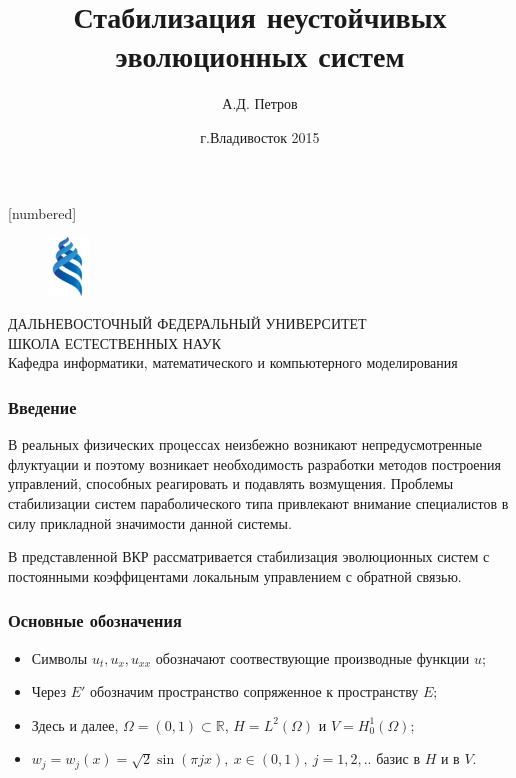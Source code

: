 \documentclass{beamer}
\title{Стабилизация неустойчивых эволюционных систем}
\author{А.Д. Петров}
\date{г.Владивосток 2015}
\begin{document}
[numbered]

\begin{frame}
    \begin{figure}[htb]
        \begin{center}
            \includegraphics[width=1.1cm]{dvfu.eps}
        \end{center}
    \end{figure}

    \begin{center}
        \large
        {ДАЛЬНЕВОСТОЧНЫЙ ФЕДЕРАЛЬНЫЙ УНИВЕРСИТЕТ } \\
        {ШКОЛА ЕСТЕСТВЕННЫХ НАУК} \\
        {Кафедра информатики, математического и компьютерного моделирования}
    \end{center}
    \titlepage

\end{frame}


\begin{frame}
    \frametitle{Введение}
    \hspace{5mm} В реальных физических процессах неизбежно возникают 
    непредусмотренные флуктуации и поэтому возникает необходимость разработки 
    методов построения управлений, способных реагировать и подавлять возмущения. 
    Проблемы стабилизации систем параболического типа привлекают внимание 
    специалистов в силу прикладной значимости данной системы.

    \hspace{5mm} В представленной ВКР рассматривается стабилизация эволюционных систем с 
    постоянными коэффицентами локальным управлением с обратной связью.
\end{frame}

\begin{frame}
    \frametitle{Основные обозначения}
    \begin{itemize}
        \item Символы $u_t, u_x, u_{xx}$ обозначают соотвествующие производные
            функции $u$;
        \item Через $E'$ обозначим пространство сопряженное к пространству $E$;
        \item Здесь и далее, $\Omega = (0, 1) \subset \mathbb{R}$, $H =
            L^2(\Omega)$ и
            $V = H^1_0(\Omega)$;
        \item $w_j = w_j(x) = \sqrt{2}\sin{(\pi j x)}, \ x \in (0, 1), \
            j=1, 2,..$ базис в $H$ и в $V$.
    \end{itemize}
\end{frame}
\end{document}
